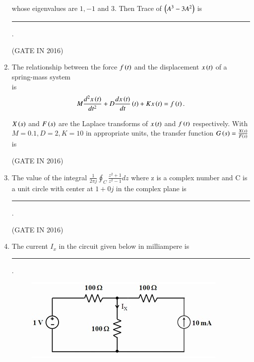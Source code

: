 \documentclass[journal,12pt,onecolumn]{IEEEtran}
\theoremstyle{remark}
\begin{document}
\begin{enumerate}
whose eigenvalues are $1, -1$ and $3$. Then Trace of $\left(A^3 - 3A^2\right)$ is \rule{2cm}{0.4pt}.

\hfill{(GATE IN 2016)}

\item The relationship between the force $f\left(t\right)$ and the displacement $x\left(t\right)$ of a spring-mass system \\  is
\begin{align}
M\frac{d^2x\left(t\right)}{dt^2} + D \frac{d x\left(t\right)}{dt}\left(t\right)+Kx\left(t\right) = f\left(t\right).
\end{align}

$X\left(s\right)$ and $F\left(s\right)$ are the Laplace transforms of $x\left(t\right)$ and $f\left(t\right)$ respectively. With $M = 0.1, D = 2, K = 10$ in appropriate units, the transfer function $G\left(s\right) = \frac{X\left(s\right)}{F\left(s\right)}$ is

\hfill{(GATE IN 2016)}
\begin{enumerate}
\end{enumerate}

\item The value of the integral $\frac{1}{2\pi j} \oint_C \frac{z^2+1}{z^2-1} dz$ where z is a complex number and C is a unit circle with center at $1+0j$ in the complex plane is \rule{2cm}{0.4pt}.

\hfill{(GATE IN 2016)}

\item The current $I_x$ in the circuit given below in milliampere is \rule{2cm}{0.4pt}.
\begin{figure}[H]
\centering
\includegraphics[width=0.6\columnwidth]{figs/z12.jpg}
\caption*{}
\label{fig:q12}
\end{figure}


\end{enumerate}
\end{document}
